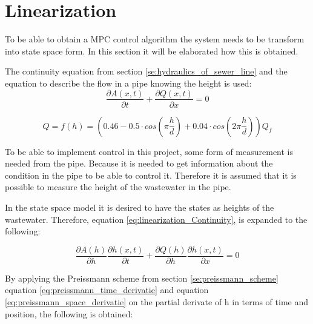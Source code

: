 \section{Linearization}\label{se:linearization}
To be able to obtain a MPC control algorithm the system needs to be transform into state space form. In this section it will be elaborated how this is obtained.


The continuity equation from section \ref{se:hydraulics_of_sewer_line} and the equation to describe the flow in a pipe knowing the height is used: 
\begin{equation}\label{eq:linearization_Continuity}
\frac{\partial A(x,t)}{\partial t} + \frac{\partial Q(x,t)}{\partial x}=0
\end{equation}

\begin{equation}\label{eq:flow_eq_given_a_height}
	Q = f(h) = \left(0.46-0.5 \cdot cos\left(\pi \frac{h}{d}\right)+0.04\cdot cos\left(2\pi\frac{h}{d}\right)\right)Q_f
\end{equation}

To be able to implement control in this project, some form of measurement is needed from the pipe. Because it is needed to get information about the condition in the pipe to be able to control it. Therefore it is assumed that it is possible to measure the height of the wastewater in the pipe.



In the state space model it is desired to have the states as heights of the wastewater. Therefore, equation \ref{eq:linearization_Continuity}, is expanded to the following:

\begin{equation}
	\frac{\partial A(h)}{\partial h}\frac{\partial h(x,t)}{\partial t} + \frac{\partial Q(h)}{\partial h}\frac{\partial h(x,t)}{\partial x}=0
\end{equation}

By applying the Preissmann scheme from section \ref{se:preissmann_scheme} equation \ref{eq:preissmann_time_derivatie} and equation \ref{eq:preissmann_space_derivatie} on the partial derivate of h in terms of time and position, the following is obtained: 

